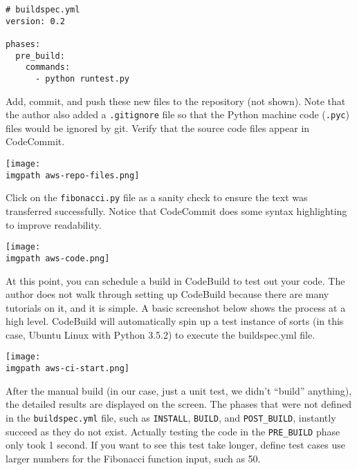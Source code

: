 \begin{verbatim}
# buildspec.yml
version: 0.2

phases:
  pre_build:
    commands:
      - python runtest.py
\end{verbatim}

Add, commit, and push these new files to the repository (not shown). Note that
the author also added a \verb|.gitignore| file so that the Python machine code
(\verb|.pyc|) files would be ignored by git. Verify that the source code files
appear in CodeCommit.

    \begin{minipage}[t]{\linewidth}
	  \centering
      \texttt{[image: \\imgpath aws-repo-files.png]}
    \end{minipage}

Click on the \verb|fibonacci.py| file as a sanity check to ensure the text was
transferred successfully. Notice that CodeCommit does some syntax highlighting
to improve readability.

    \begin{minipage}[t]{\linewidth}
	  \centering
      \texttt{[image: \\imgpath aws-code.png]}
    \end{minipage}

At this point, you can schedule a build in CodeBuild to test out your code.
The author does not walk through setting up CodeBuild because there are many
tutorials on it, and it is simple. A basic screenshot below shows the process
at a high level. CodeBuild will automatically spin up a test instance of sorts
(in this case, Ubuntu Linux with Python 3.5.2) to execute the buildspec.yml file.

    \begin{minipage}[t]{\linewidth}
	  \centering
      \texttt{[image: \\imgpath aws-ci-start.png]}
    \end{minipage}

After the manual build (in our case, just a unit test, we didn't ``build''
anything), the detailed results are displayed on the screen. The phases that
were not defined in the \verb|buildspec.yml| file, such as \verb|INSTALL|,
\verb|BUILD|, and \verb|POST_BUILD|, instantly succeed as they do not exist.
Actually testing the code in the \verb|PRE_BUILD| phase only took 1 second.
If you want to see this test take longer, define test cases use larger numbers
for the Fibonacci function input, such as 50.

